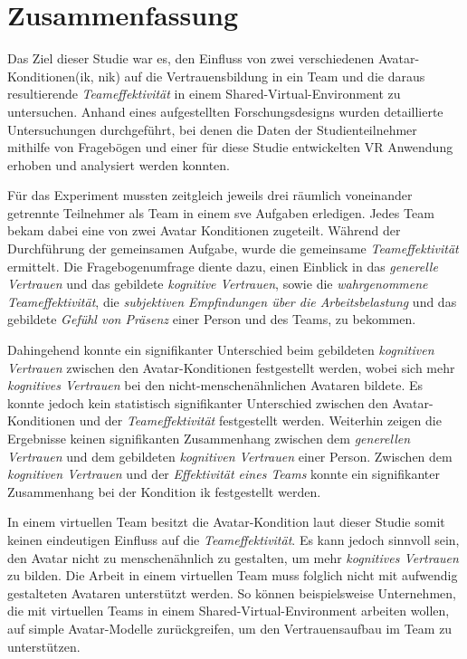\documentclass[a4paper,11pt]{article}%
\renewcommand{\\}{\vspace*{0.5\baselineskip} \newline}
\begin{document}
{{\section{Zusammenfassung}
Das Ziel dieser Studie war es, den Einfluss von zwei verschiedenen Avatar-Konditionen\newline (\ac{ik}, \ac{nik}) auf die Vertrauensbildung in ein Team und die daraus resultierende \textit{Teameffektivität} in einem Shared-Virtual-Environment zu untersuchen. 
Anhand eines aufgestellten Forschungsdesigns wurden detaillierte Untersuchungen durchgeführt, bei denen die Daten der Studienteilnehmer mithilfe von Fragebögen und einer für diese Studie entwickelten VR Anwendung erhoben und analysiert werden konnten.

Für das Experiment mussten zeitgleich jeweils drei räumlich voneinander getrennte Teilnehmer als Team in einem \ac{sve} Aufgaben erledigen. Jedes Team bekam dabei eine von zwei Avatar Konditionen zugeteilt. Während der Durchführung der gemeinsamen Aufgabe, wurde die gemeinsame \textit{Teameffektivität} ermittelt. Die Fragebogenumfrage diente dazu, einen Einblick in das \textit{generelle Vertrauen} und das gebildete \textit{kognitive Vertrauen}, sowie die \textit{wahrgenommene Teameffektivität}, die \textit{subjektiven Empfindungen über die Arbeitsbelastung} und das gebildete \textit{Gefühl von Präsenz} einer Person und des Teams, zu bekommen.

Dahingehend konnte ein signifikanter Unterschied beim gebildeten \textit{kognitiven Vertrauen} zwischen den Avatar-Konditionen festgestellt werden, wobei sich mehr \textit{kognitives Vertrauen} bei den nicht-menschenähnlichen Avataren bildete. Es konnte jedoch kein statistisch signifikanter Unterschied zwischen den Avatar-Konditionen und der \textit{Teameffektivität} festgestellt werden. Weiterhin zeigen die Ergebnisse keinen signifikanten Zusammenhang zwischen dem \textit{generellen Vertrauen} und dem gebildeten \textit{kognitiven Vertrauen} einer Person. Zwischen dem \textit{kognitiven Vertrauen} und der \textit{Effektivität eines Teams} konnte ein signifikanter Zusammenhang bei der Kondition \ac{ik} festgestellt werden.

In einem virtuellen Team besitzt die Avatar-Kondition laut dieser Studie somit keinen eindeutigen Einfluss auf die \textit{Teameffektivität}. Es kann jedoch sinnvoll sein, den Avatar nicht zu menschenähnlich zu gestalten, um mehr \textit{kognitives Vertrauen} zu bilden.
Die Arbeit in einem virtuellen Team muss folglich nicht mit aufwendig gestalteten Avataren unterstützt werden. So können beispielsweise Unternehmen, die mit virtuellen Teams in einem Shared-Virtual-Environment arbeiten wollen, auf simple Avatar-Modelle zurückgreifen, um den Vertrauensaufbau im Team zu unterstützen.

}}
\end{document}
